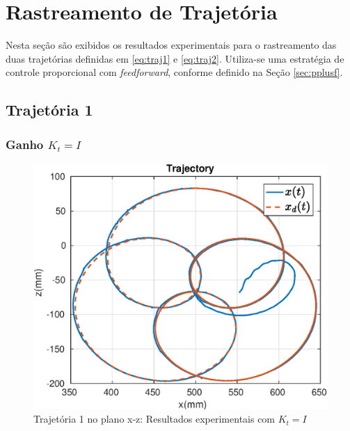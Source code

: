 \section{Rastreamento de Trajetória}

Nesta seção são exibidos os resultados experimentais para o rastreamento das duas trajetórias definidas em \eqref{eq:traj1} e \eqref{eq:traj2}. Utiliza-se uma estratégia de controle proporcional com \textit{feedforward}, conforme definido na Seção \ref{sec:pplusf}. 

\subsection{Trajetória 1}

\subsubsection{Ganho ${K}_t = {I}$}

\begin{figure}[H]
\centering
  \includegraphics[width=0.5\linewidth]{./img/traj_1_k1/traj.eps}
  \caption{Trajetória 1 no plano x-z: Resultados experimentais com ${K}_t = {I}$}
  \label{fig:sub1}
\end{figure}%

